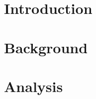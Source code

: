 \documentclass[11pt]{article}                             %
\newenvironment{colfigure}{                               %
  {\noindent\minipage{\linewidth}}                        %
  {\endminipage\par\bigskip}                              %
}
\newcommand{\colgraphic}[2]{%
  \begin{colfigure}                                       %
    \centering                                            %
    \texttt{[image: \#1]}            %
    \captionof{figure}{#2}                                %
  \end{colfigure}
}
\begin{document}

\section{Introduction}                                    %
\blindtext[1]                                             %

\medskip                                                  %
\noindent\makebox[\linewidth]{                            %
  \rule{\textwidth}{0.2pt}
}

\begin{multicols}{2}                                      %
  \section{Background}                                    %
  \blindtext

  \section{Analysis}
  \blindtext

  \bigskip                                                %

  \noindent\blindtext                                     %

\end{multicols}                                           %
\end{document}
